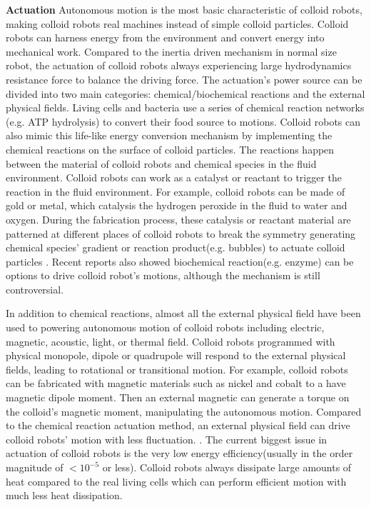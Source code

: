 \textbf{Actuation} Autonomous motion is the most basic characteristic of colloid robots, making colloid robots real machines instead of simple colloid particles. Colloid robots can harness energy from the environment and convert energy into mechanical work. Compared to the inertia driven mechanism in normal size robot, the actuation of colloid robots always experiencing large hydrodynamics resistance force to balance the driving force. The actuation's power source can be divided into two main categories: chemical/biochemical reactions and the external physical fields. Living cells and bacteria use a series of  chemical reaction networks (e.g. ATP hydrolysis) to convert their food source to motions. Colloid robots can also mimic this life-like energy conversion mechanism by implementing the chemical reactions on the surface of colloid particles. The reactions happen between the material of colloid robots and chemical species in the fluid environment. Colloid robots can work as a catalyst or reactant to trigger the reaction in the fluid environment. For example,  colloid robots can be made of gold or metal,  which catalysis the hydrogen peroxide in the fluid to water and oxygen. During the fabrication process, these catalysis or reactant material are patterned at different places of colloid robots to break the symmetry generating chemical species' gradient or reaction product(e.g. bubbles) to actuate colloid particles \cite{velegol2016origins,shklyaev2016harnessing,parmar2018micro}. Recent reports also showed biochemical reaction(e.g. enzyme) can be options to drive colloid robot's motions, although the mechanism is still controversial.\cite{zhao2018substrate,somasundar2019positive}

In addition to  chemical reactions, almost all the external physical field have been used to powering autonomous motion of colloid robots including electric\cite{lee2019directed}, magnetic\cite{zhang2009artificial}, acoustic\cite{sabrina2018shape}, light\cite{dai2016programmable}, or thermal field\cite{lozano2016phototaxis}.  Colloid robots programmed with physical monopole, dipole or quadrupole will respond to the external physical fields, leading to rotational or transitional motion. For example, colloid robots can be fabricated with magnetic materials such as nickel and cobalt to a have magnetic dipole moment. Then an external magnetic can generate a torque on the colloid's magnetic moment, manipulating the autonomous motion. Compared to the  chemical reaction actuation method, an external physical field can drive colloid robots' motion with less fluctuation. \cite{han2018engineering,ren2018two}. 
The current biggest issue in actuation of colloid robots is the very low energy efficiency(usually in the order magnitude of $<10^{-5}$ or less). Colloid robots always dissipate large amounts of heat\cite{wang2013understanding} compared to the real living cells which can perform efficient motion with much less heat dissipation.


